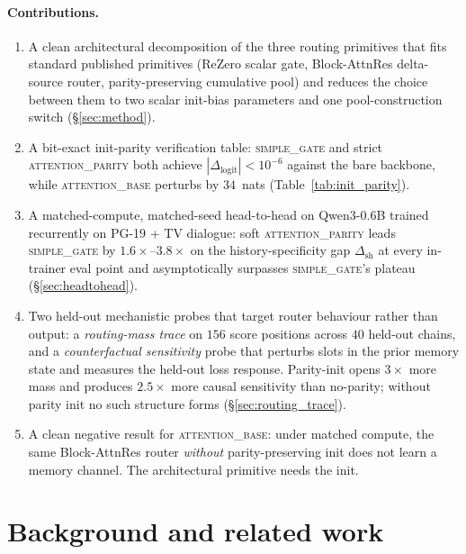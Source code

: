 \documentclass{article}
\newcommand{\dsh}{\Delta_{\text{sh}}}
\begin{document}
\paragraph{Contributions.}
\begin{enumerate}\setlength{\itemsep}{1pt}
\item A clean architectural decomposition of the three routing
primitives that fits standard published primitives (ReZero scalar
gate, Block-AttnRes delta-source router, parity-preserving cumulative
pool) and reduces the choice between them to two scalar
init-bias parameters and one pool-construction switch
(\S\ref{sec:method}).
\item A bit-exact init-parity verification table:
\textsc{simple\_gate} and strict \textsc{attention\_parity} both
achieve $|\Delta_{\text{logit}}| < 10^{-6}$ against the bare
backbone, while \textsc{attention\_base} perturbs by $34$~nats
(Table~\ref{tab:init_parity}).
\item A matched-compute, matched-seed head-to-head on Qwen3-0.6B
trained recurrently on PG-19 + TV dialogue: soft
\textsc{attention\_parity} leads \textsc{simple\_gate} by
$1.6\times$--$3.8\times$ on the history-specificity gap $\dsh$ at
every in-trainer eval point and asymptotically surpasses
\textsc{simple\_gate}'s plateau (\S\ref{sec:headtohead}).
\item Two held-out mechanistic probes that target router behaviour
rather than output: a \emph{routing-mass trace} on $156$ score
positions across $40$ held-out chains, and a \emph{counterfactual
sensitivity} probe that perturbs slots in the prior memory state and
measures the held-out loss response.  Parity-init opens $3\times$
more mass and produces $2.5\times$ more causal sensitivity than no-parity;
without parity init no such structure forms (\S\ref{sec:routing_trace}).
\item A clean negative result for \textsc{attention\_base}: under
matched compute, the same Block-AttnRes router \emph{without}
parity-preserving init does not learn a memory channel.
The architectural primitive needs the init.
\end{enumerate}

\section{Background and related work}
\label{sec:related}
\end{document}
